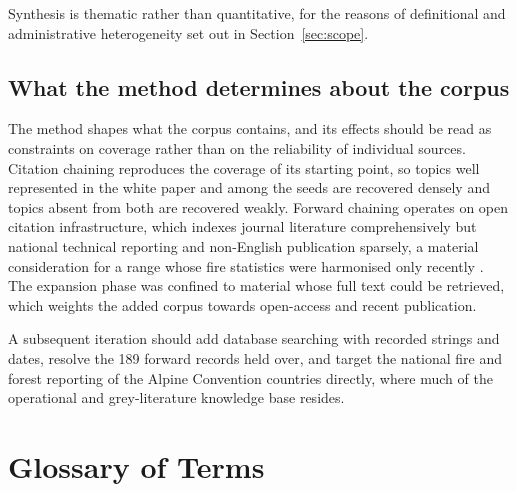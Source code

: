 \documentclass[11pt,a4paper]{article}
\begin{document}
Synthesis is thematic rather than quantitative, for the reasons of definitional and administrative heterogeneity set out in Section~\ref{sec:scope}.

\subsection{What the method determines about the corpus}

The method shapes what the corpus contains, and its effects should be read as constraints on coverage rather than on the reliability of individual sources. Citation chaining reproduces the coverage of its starting point, so topics well represented in the white paper and among the seeds are recovered densely and topics absent from both are recovered weakly. Forward chaining operates on open citation infrastructure, which indexes journal literature comprehensively but national technical reporting and non-English publication sparsely, a material consideration for a range whose fire statistics were harmonised only recently \citep{valese_wildfires_2011}. The expansion phase was confined to material whose full text could be retrieved, which weights the added corpus towards open-access and recent publication.

A subsequent iteration should add database searching with recorded strings and dates, resolve the 189 forward records held over, and target the national fire and forest reporting of the Alpine Convention countries directly, where much of the operational and grey-literature knowledge base resides.

\section{Glossary of Terms}
\end{document}
